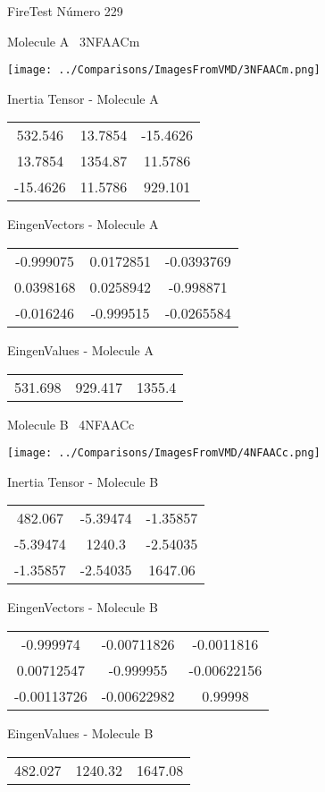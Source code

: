 \vtab[-3cm]
\begin{center}
{\large FireTest \tab Número 229}
\end{center}
\begin{multicols}{2}
\begin{center}

Molecule A \
3NFAACm

\texttt{[image: ../Comparisons/ImagesFromVMD/3NFAACm.png]}

Inertia Tensor - Molecule A \\
\begin{tabular}{|c c c|}
532.546	 & 	13.7854	 & 	-15.4626	 \\
13.7854	 & 	1354.87	 & 	11.5786	 \\
-15.4626	 & 	11.5786	 & 	929.101
\end{tabular}

\vtab
 EingenVectors - Molecule A     \\
\begin{tabular}{|c c c|}
-0.999075	 & 	0.0172851	 & 	-0.0393769	 \\
0.0398168	 & 	0.0258942	 & 	-0.998871	 \\
-0.016246	 & 	-0.999515	 & 	-0.0265584
\end{tabular}

\vtab
 EingenValues - Molecule A     \\
\begin{tabular}{|c c c|}
531.698	 & 	929.417	 & 	1355.4	 \\
\end{tabular}
\columnbreak

Molecule B \
4NFAACc

\texttt{[image: ../Comparisons/ImagesFromVMD/4NFAACc.png]}

Inertia Tensor - Molecule B \\
\begin{tabular}{|c c c|}
482.067	 & 	-5.39474	 & 	-1.35857	 \\
-5.39474	 & 	1240.3	 & 	-2.54035	 \\
-1.35857	 & 	-2.54035	 & 	1647.06
\end{tabular}

\vtab
 EingenVectors - Molecule B     \\
\begin{tabular}{|c c c|}
-0.999974	 & 	-0.00711826	 & 	-0.0011816	 \\
0.00712547	 & 	-0.999955	 & 	-0.00622156	 \\
-0.00113726	 & 	-0.00622982	 & 	0.99998
\end{tabular}

\vtab
 EingenValues - Molecule B     \\
\begin{tabular}{|c c c|}
482.027	 & 	1240.32	 & 	1647.08	 \\
\end{tabular}

\end{center}
\end{multicols}

